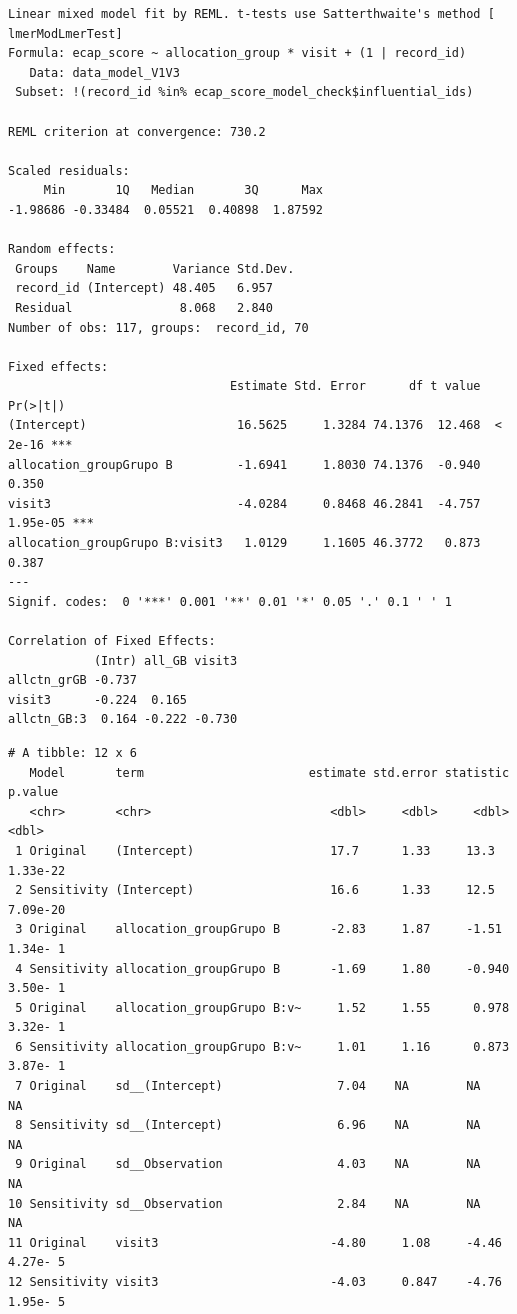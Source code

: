 \documentclass[
  letterpaper,
  DIV=11,
  numbers=noendperiod]{scrartcl}
\newenvironment{Shaded}{\begin{snugshade}}{\end{snugshade}}
\newcommand{\NormalTok}[1]{\textcolor[rgb]{0.00,0.23,0.31}{#1}}
\newcommand{\SpecialCharTok}[1]{\textcolor[rgb]{0.37,0.37,0.37}{#1}}
\begin{document}
\begin{verbatim}
Linear mixed model fit by REML. t-tests use Satterthwaite's method [
lmerModLmerTest]
Formula: ecap_score ~ allocation_group * visit + (1 | record_id)
   Data: data_model_V1V3
 Subset: !(record_id %in% ecap_score_model_check$influential_ids)

REML criterion at convergence: 730.2

Scaled residuals: 
     Min       1Q   Median       3Q      Max 
-1.98686 -0.33484  0.05521  0.40898  1.87592 

Random effects:
 Groups    Name        Variance Std.Dev.
 record_id (Intercept) 48.405   6.957   
 Residual               8.068   2.840   
Number of obs: 117, groups:  record_id, 70

Fixed effects:
                               Estimate Std. Error      df t value Pr(>|t|)    
(Intercept)                     16.5625     1.3284 74.1376  12.468  < 2e-16 ***
allocation_groupGrupo B         -1.6941     1.8030 74.1376  -0.940    0.350    
visit3                          -4.0284     0.8468 46.2841  -4.757 1.95e-05 ***
allocation_groupGrupo B:visit3   1.0129     1.1605 46.3772   0.873    0.387    
---
Signif. codes:  0 '***' 0.001 '**' 0.01 '*' 0.05 '.' 0.1 ' ' 1

Correlation of Fixed Effects:
            (Intr) all_GB visit3
allctn_grGB -0.737              
visit3      -0.224  0.165       
allctn_GB:3  0.164 -0.222 -0.730
\end{verbatim}

\begin{Shaded}
\end{Shaded}

\begin{verbatim}
# A tibble: 12 x 6
   Model       term                       estimate std.error statistic   p.value
   <chr>       <chr>                         <dbl>     <dbl>     <dbl>     <dbl>
 1 Original    (Intercept)                   17.7      1.33     13.3    1.33e-22
 2 Sensitivity (Intercept)                   16.6      1.33     12.5    7.09e-20
 3 Original    allocation_groupGrupo B       -2.83     1.87     -1.51   1.34e- 1
 4 Sensitivity allocation_groupGrupo B       -1.69     1.80     -0.940  3.50e- 1
 5 Original    allocation_groupGrupo B:v~     1.52     1.55      0.978  3.32e- 1
 6 Sensitivity allocation_groupGrupo B:v~     1.01     1.16      0.873  3.87e- 1
 7 Original    sd__(Intercept)                7.04    NA        NA     NA       
 8 Sensitivity sd__(Intercept)                6.96    NA        NA     NA       
 9 Original    sd__Observation                4.03    NA        NA     NA       
10 Sensitivity sd__Observation                2.84    NA        NA     NA       
11 Original    visit3                        -4.80     1.08     -4.46   4.27e- 5
12 Sensitivity visit3                        -4.03     0.847    -4.76   1.95e- 5
\end{verbatim}
\end{document}
